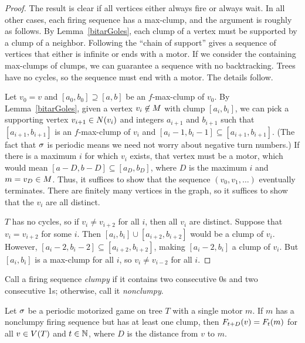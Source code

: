\begin{proof}
The result is clear if all vertices either always fire or always wait. In all
other cases, each firing sequence has a max-clump, and the argument is roughly
as follows. By Lemma~\ref{bitarGoles}, each clump of a vertex must be supported
by a clump of a neighbor.  Following the ``chain of support'' gives a sequence
of vertices that either is infinite or ends with a motor. If we consider the
containing max-clumps of clumps, we can guarantee a sequence with no
backtracking. Trees have no cycles, so the sequence must end with a motor. The
details follow.

Let $v_0 = v$ and $[a_0, b_0] \supseteq [a, b]$ be an $f$-max-clump of
$v_0$. By Lemma~\ref{bitarGoles}, given a vertex $v_i \not\in \mots$ with clump
$[a_i, b_i]$, we can pick a supporting vertex $v_{i+1} \in \N{v_i}$ and
integers $a_{i+1}$ and $b_{i+1}$ such that $[a_{i+1}, b_{i+1}]$ is an
$f$-max-clump of $v_i$ and $[a_i - 1, b_i - 1] \subseteq [a_{i+1},
b_{i+1}]$. (The fact that $\s$ is periodic means we need not worry about
negative turn numbers.) If there is a maximum $i$ for which $v_i$ exists, that
vertex must be a motor, which would mean $[a-D, b-D] \subseteq [a_D, b_D]$,
where $D$ is the maximum $i$ and $m = v_D \in \mots$. Thus, it suffices to show
that the sequence $(v_0, v_1, \ldots)$ eventually terminates. There are
finitely many vertices in the graph, so it suffices to show that the $v_i$ are
all distinct.

$T$ has no cycles, so if $v_i \neq v_{i+2}$ for all $i$, then all $v_i$ are
distinct. Suppose that $v_i = v_{i+2}$ for some $i$. Then $[a_i, b_i] \cup
[a_{i+2}, b_{i+2}]$ would be a clump of $v_i$. However, $[a_i - 2, b_i - 2]
\subseteq [a_{i+2}, b_{i+2}]$, making $[a_i - 2, b_i]$ a clump of $v_i$. But
$[a_i, b_i]$ is a max-clump for all $i$, so $v_i \neq v_{i-2}$ for all $i$.
\end{proof}

Call a firing sequence \emph{clumpy} if it contains two consecutive 0s and two
consecutive 1s; otherwise, call it \emph{nonclumpy}.

\begin{cor} \label{freeLunch}
Let $\s$ be a periodic motorized game on tree $T$ with a single motor $m$. If
$m$ has a nonclumpy firing sequence but has at least one clump, then
$\firing{v}{t+D} = \firing{m}{t}$ for all $v \in \V[T]$ and $t \in \nats$,
where $D$ is the distance from $v$ to $m$.
\end{cor}

